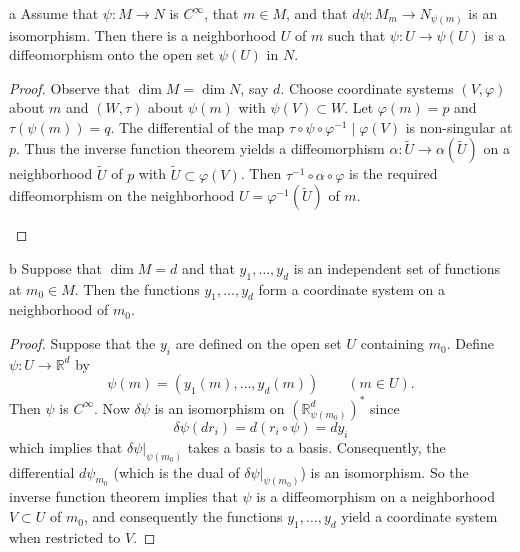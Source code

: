 \begin{corollary*}{a}
	Assume that $\psi\colon M \to N$ is $C^{\infty}$, that $m \in M$, and that $d\psi\colon M_{m} \to N_{\psi(m)}$ is an isomorphism. Then there is a neighborhood $U$ of $m$ such that $\psi\colon U \to \psi(U)$ is a diffeomorphism onto the open set $\psi(U)$ in $N$.
\end{corollary*}

\begin{proof}
	Observe that $\dim M = \dim N$, say $d$. Choose coordinate systems $(V, \varphi)$ about $m$ and $(W, \tau)$ about $\psi(m)$ with $\psi(V) \subset W$. Let $\varphi(m) = p$ and $\tau(\psi(m)) = q$. The differential of the map $\tau \circ \psi \circ \varphi^{-1} \mid \varphi(V)$ is non-singular at $p$. Thus the inverse function theorem yields a diffeomorphism $\alpha\colon \tilde{U} \to \alpha(\tilde{U})$ on a neighborhood $\tilde{U}$ of $p$ with $\tilde{U} \subset \varphi(V)$. Then $\tau^{-1} \circ \alpha \circ \varphi$ is the required diffeomorphism on the neighborhood $U = \varphi^{-1}(\tilde{U})$ of $m$.

	\begin{center}
	\end{center}
\end{proof}

\begin{corollary*}{b}
	Suppose that $\dim M = d$ and that $y_1, \ldots, y_d$ is an independent set of functions at $m_0 \in M$. Then the functions $y_1, \ldots, y_d$ form a coordinate system on a neighborhood of $m_0$. 
\end{corollary*}

\begin{proof}
	Suppose that the $y_i$ are defined on the open set $U$ containing $m_0$. Define $\psi\colon U \to \mathbb{R}^d$ by
	\[
		\psi(m)=\left(y_{1}(m),\ldots,y_{d}(m)\right)\qquad(m\in U).
	\]
	Then $\psi$ is $C^{\infty}$. Now $\delta\psi$ is an isomorphism on $(\mathbb{R}^{d}_{\psi(m_{0})})^{*}$ since
	\[
		\delta\psi(d r_{i})=d(r_{i}\circ\psi)=d y_{i}
	\]
	which implies that $\delta\psi\big|_{\psi(m_0)}$ takes a basis to a basis. Consequently, the differential $d\psi_{m_0}$ (which is the dual of $\delta\psi\big|_{\psi(m_0)}$) is an isomorphism. So the inverse function theorem implies that $\psi$ is a diffeomorphism on a neighborhood $V \subset U$ of $m_0$, and consequently the functions $y_1, \ldots, y_d$ yield a coordinate system when restricted to $V$.
\end{proof}

